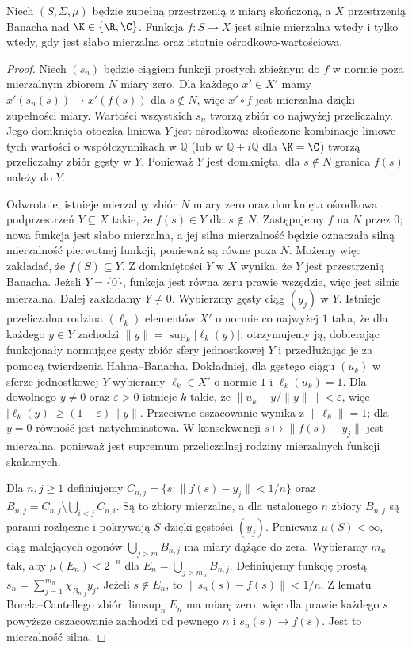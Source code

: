 \begin{twierdzenie}
\label{thm:pettis-meas15b}
Niech $(S,\Sigma,\mu)$ będzie zupełną przestrzenią z miarą
skończoną, a $X$ przestrzenią Banacha nad $\K\in\{\R,\C\}$.
Funkcja $f:S\to X$ jest silnie mierzalna wtedy i tylko wtedy, gdy
jest słabo mierzalna oraz istotnie ośrodkowo-wartościowa.
\end{twierdzenie}
\begin{proof}
Niech $(s_n)$ będzie ciągiem funkcji prostych zbieżnym do $f$
w normie poza mierzalnym zbiorem $N$ miary zero. Dla każdego
$x'\in X'$ mamy $x'(s_n(s))\to x'(f(s))$ dla $s\notin N$,
więc $x'\circ f$ jest mierzalna dzięki zupełności miary.
Wartości wszystkich $s_n$ tworzą zbiór co najwyżej przeliczalny.
Jego domknięta otoczka liniowa $Y$ jest ośrodkowa: skończone
kombinacje liniowe tych wartości o współczynnikach w $\mathbb Q$
(lub w $\mathbb Q+i\mathbb Q$ dla $\K=\C$) tworzą przeliczalny
zbiór gęsty w $Y$. Ponieważ $Y$ jest domknięta, dla $s\notin N$
granica $f(s)$ należy do $Y$.

Odwrotnie, istnieje mierzalny zbiór $N$ miary zero oraz
domknięta ośrodkowa podprzestrzeń $Y\subseteq X$ takie, że
$f(s)\in Y$ dla $s\notin N$. Zastępujemy $f$ na $N$ przez $0$;
nowa funkcja jest słabo mierzalna, a jej silna mierzalność
będzie oznaczała silną mierzalność pierwotnej funkcji,
ponieważ są równe poza $N$. Możemy więc zakładać, że $f(S)\subseteq Y$.
Z domkniętości $Y$ w $X$ wynika, że $Y$ jest przestrzenią Banacha.
Jeżeli $Y=\{0\}$, funkcja jest równa zeru prawie wszędzie,
więc jest silnie mierzalna. Dalej zakładamy $Y\ne0$.
Wybierzmy gęsty ciąg $(y_j)$ w $Y$. Istnieje przeliczalna
rodzina $(\ell_k)$ elementów $X'$ o normie co najwyżej $1$
taka, że dla każdego $y\in Y$ zachodzi
$\|y\|=\sup_k|\ell_k(y)|$: otrzymujemy ją, dobierając
funkcjonały normujące gęsty zbiór sfery jednostkowej $Y$
i przedłużając je za pomocą twierdzenia Hahna--Banacha.
Dokładniej, dla gęstego ciągu $(u_k)$ w sferze jednostkowej
$Y$ wybieramy $\ell_k\in X'$ o normie $1$ i
$\ell_k(u_k)=1$. Dla dowolnego $y\ne0$ oraz $\varepsilon>0$
istnieje $k$ takie, że $\|u_k-y/\|y\|\|<\varepsilon$,
więc $|\ell_k(y)|\ge(1-\varepsilon)\|y\|$.
Przeciwne oszacowanie wynika z $\|\ell_k\|=1$;
dla $y=0$ równość jest natychmiastowa.
W konsekwencji $s\mapsto\|f(s)-y_j\|$ jest mierzalna,
ponieważ jest supremum przeliczalnej rodziny mierzalnych
funkcji skalarnych.

Dla $n,j\ge1$ definiujemy
$C_{n,j}=\{s:\|f(s)-y_j\|<1/n\}$ oraz
$B_{n,j}=C_{n,j}\setminus\bigcup_{i<j}C_{n,i}$.
Są to zbiory mierzalne, a dla ustalonego $n$ zbiory $B_{n,j}$
są parami rozłączne i pokrywają $S$ dzięki gęstości $(y_j)$.
Ponieważ $\mu(S)<\infty$, ciąg malejących ogonów
$\bigcup_{j>m}B_{n,j}$ ma miary dążące do zera.
Wybieramy $m_n$ tak, aby $\mu(E_n)<2^{-n}$ dla
$E_n=\bigcup_{j>m_n}B_{n,j}$. Definiujemy funkcję prostą
$s_n=\sum_{j=1}^{m_n}\chi_{B_{n,j}}y_j$.
Jeżeli $s\notin E_n$, to $\|s_n(s)-f(s)\|<1/n$.
Z lematu Borela--Cantellego zbiór $\limsup_n E_n$
ma miarę zero, więc dla prawie każdego $s$ powyższe
oszacowanie zachodzi od pewnego $n$ i $s_n(s)\to f(s)$.
Jest to mierzalność silna.
\end{proof}

